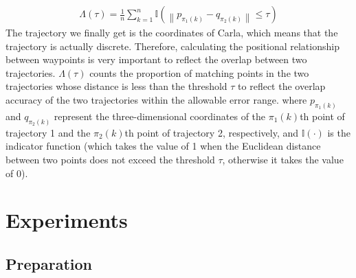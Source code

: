 \documentclass[lettersize,journal]{IEEEtran}
\begin{document}
\begin{align}
	\Lambda(\tau) = \frac{1}{n} \sum_{k=1}^{n} \mathbb{I}\left(\left\|p_{\pi_{1}(k)}-q_{\pi_{2}(k)}\right\| \leq \tau\right)
\end{align}
The trajectory we finally get is the coordinates of Carla, which means that the trajectory is actually discrete.
Therefore, calculating the positional relationship between waypoints is very important to reflect the overlap between two trajectories.
\(\Lambda(\tau)\) counts the proportion of matching points in the two trajectories whose distance is less than the threshold \(\tau\) to reflect the overlap accuracy of the two trajectories within the allowable error range.
where \(p_{\pi_{1}(k)}\) and \(q_{\pi_{2}(k)}\) represent the three-dimensional coordinates of the \(\pi_{1}(k)\)th point of trajectory 1 and the \(\pi_{2}(k)\)th point of trajectory 2, respectively, and \(\mathbb{I}(\cdot)\) is the indicator function (which takes the value of 1 when the Euclidean distance between two points does not exceed the threshold \(\tau\), otherwise it takes the value of 0).


\section{Experiments}

\subsection{Preparation}
\end{document}
